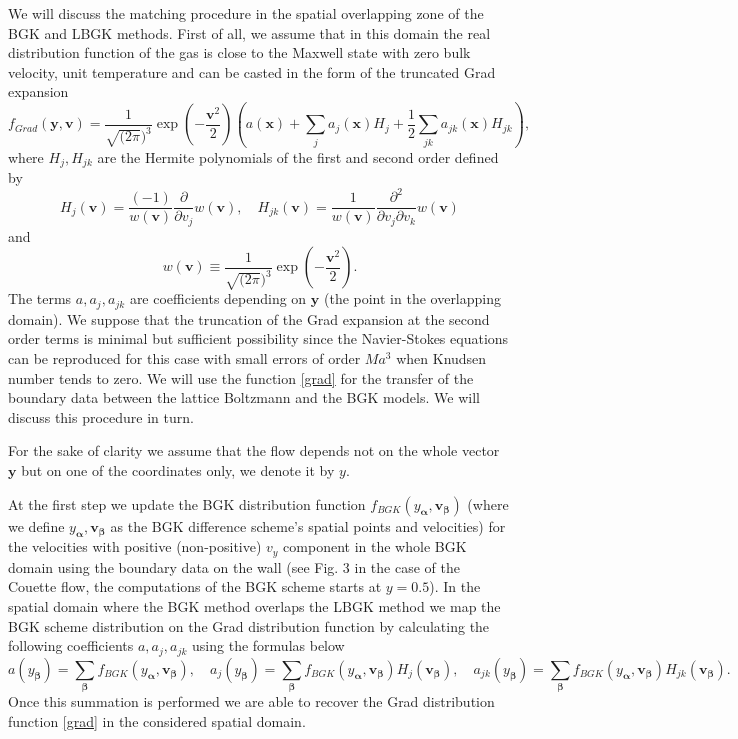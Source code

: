 \documentclass[]{elsarticle} %
\begin{document}
{We will discuss the   matching  procedure   in the spatial overlapping  zone  of the BGK and LBGK methods.
First of all, we  assume that in this  domain  the real distribution function of the gas is close  to the Maxwell state with zero bulk velocity,  unit temperature and  can  be casted in the  form of the truncated  Grad expansion
\begin{equation}\label{grad}
f_{Grad}(\mathbf{y},\mathbf{v})=\frac{1}{\sqrt{(2\pi})^3}\exp\left(-\frac{\mathbf{v}^2}{2}\right)\left(a(\mathbf{x})
+\sum_{j}a_j(\mathbf{x})H_{j}+\frac{1}{2}\sum_{jk}a_{jk}(\mathbf{x})H_{jk}\right),
\end{equation}
 where $H_j, H_{jk}$ are the  Hermite polynomials of the first and second order defined by
  $$
H_j(\mathbf{v})=\frac{(-1)}{w(\mathbf{v})}\frac{\partial}{\partial v_j}w(\mathbf{v}),  \quad H_{jk}(\mathbf{v})=\frac{1}{w(\mathbf{v})}\frac{\partial^2}{\partial v_j\partial v_k}w(\mathbf{v})
$$
and
 $$
 w(\mathbf{v})\equiv \frac{1}{\sqrt{(2\pi})^3}\exp\left(-\frac{\mathbf{v}^2}{2}\right).
 $$
 The  terms $a, a_j,a_{jk}$ are coefficients depending on $\mathbf{y}$ (the point in the overlapping domain). We suppose  that the truncation of the  Grad expansion at the  second order terms is  minimal  but sufficient  possibility since  the Navier-Stokes  equations  can be reproduced  for this  case with small errors of order $Ma^3$  when Knudsen number  tends  to zero.
 We will use the function \eqref{grad} for the transfer of the boundary data between the lattice Boltzmann  and the BGK models. We will discuss this  procedure  in turn.

For the sake of clarity we  assume  that the flow  depends  not on the whole vector $\mathbf{y}$ but on one of the coordinates only, we denote  it  by $y$.

At the  first  step we  update the BGK distribution function $f_{BGK}(y_{\mathbf{\alpha}},\mathbf{v}_{\mathbf{\beta}})$ (where we define $y_{\mathbf{\alpha}},\mathbf{v}_{\mathbf{\beta}}$ as the BGK difference scheme's spatial points and velocities) for the velocities with positive (non-positive) $v_y$ component  in the whole BGK domain using the boundary data on the wall (see Fig. 3 in the case  of the Couette flow, the computations of the BGK scheme starts  at $y=0.5$). In the spatial domain where  the BGK method overlaps the LBGK method we map the BGK  scheme distribution on the Grad distribution function by calculating the following coefficients $a, a_j,a_{jk}$ using  the formulas below
\begin{equation}\label{bgk_to_grad}
a(y_{\mathbf{\beta}})=\sum_{\mathbf{\beta}}  f_{BGK}(y_{\mathbf{\alpha}},\mathbf{v}_{\mathbf{\beta}}),   \quad a_j(y_{\mathbf{\beta}})=\sum_{\mathbf{\beta}}f_{BGK}(y_{\mathbf{\alpha}},\mathbf{v}_{\mathbf{\beta}})H_j(\mathbf{v}_{\mathbf{\beta}}), \quad  a_{jk}(y_{\mathbf{\beta}})=\sum_{\mathbf{\beta}}f_{BGK}(y_{\mathbf{\alpha}},\mathbf{v}_{\mathbf{\beta}})H_{jk}(\mathbf{v}_{\mathbf{\beta}}).
\end{equation}
Once  this summation is performed we are able to recover  the Grad  distribution function \eqref{grad} in the considered spatial domain.

}
\end{document}
